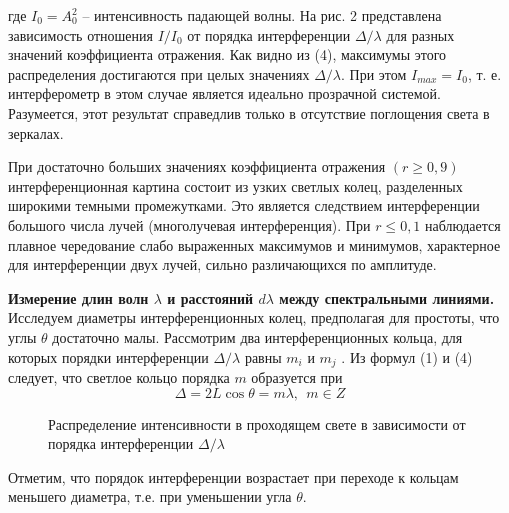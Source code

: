 \documentclass[14pt]{article}
\begin{document}
\noindent где $I_0 = A^2_0$ -- интенсивность падающей волны. На рис. 2 представлена
зависимость отношения $I/I_0$ от порядка интерференции $\Delta/\lambda$ для разных
значений коэффициента отражения. Как видно из (4), максимумы этого распределения достигаются
при целых значениях $\Delta/\lambda$. При этом $I_{max} = I_0$, т. е. интерферометр в этом случае
является идеально прозрачной системой. Разумеется, этот результат справедлив только в отсутствие
поглощения света в зеркалах.

При достаточно больших значениях коэффициента отражения $(r \geq 0,9)$ интерференционная
картина состоит из узких светлых колец, разделенных широкими темными промежутками. Это является следствием
интерференции большого числа лучей (многолучевая интерференция). При $r \leq 0,1$ наблюдается плавное чередование
слабо выраженных максимумов и минимумов, характерное для интерференции двух лучей, сильно
различающихся по амплитуде.

\vspace{0.5cm}
\textbf{Измерение длин волн $\lambda$ и расстояний $d\lambda$ между спектральными линиями.}
Исследуем диаметры интерференционных колец, предполагая для простоты, что углы $\theta$ достаточно малы.
Рассмотрим два интерференционных кольца, для которых порядки интерференции $\Delta/\lambda$ равны
$m_i$ и $m_j$ . Из формул (1) и (4) следует, что светлое кольцо порядка $m$ образуется при
\begin{equation}
	\Delta = 2L\cos\theta = m\lambda,~~m \in Z
\end{equation}

\begin{figure}[H]
	\caption{Распределение интенсивности в проходящем свете в зависимости от порядка интерференции $\Delta/\lambda$}
	\label{fig:image}
\end{figure}

\noindent Отметим, что порядок интерференции возрастает при переходе к кольцам меньшего диаметра, т.е.
при уменьшении угла $\theta$.
\end{document}
